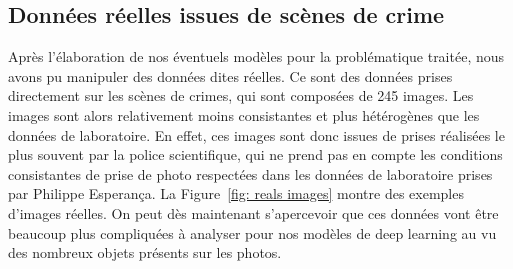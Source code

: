 \documentclass[a4paper]{article}
\begin{document}
\subsection{Données réelles issues de scènes de crime}
Après l'élaboration de nos éventuels modèles pour la problématique traitée, nous avons pu manipuler des données dites réelles. Ce sont des données prises directement sur les scènes de crimes, qui sont composées de 245 images. Les images sont alors relativement moins consistantes et plus hétérogènes que les données de laboratoire. En effet, ces images sont donc issues de prises réalisées le plus souvent par la police scientifique, qui ne prend pas en compte les conditions consistantes de prise de photo respectées dans les données de laboratoire prises par Philippe Esperança. La Figure~\ref{fig: reals images} montre des exemples d'images réelles. On peut dès maintenant s'apercevoir que ces données vont être beaucoup plus compliquées à analyser pour nos modèles de deep learning au vu des nombreux objets présents sur les photos.
\end{document}
